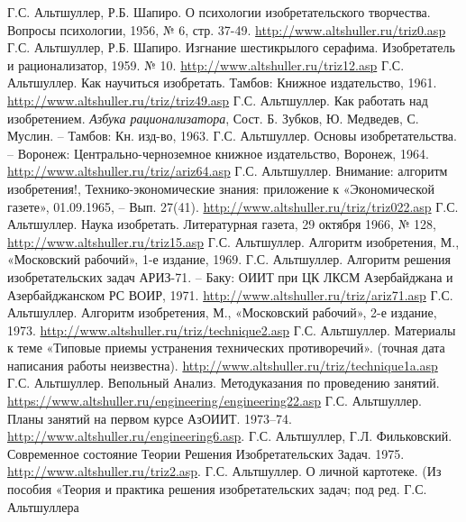 \begin{thebibliography}{xxx}
 Г.С. Альтшуллер, Р.Б. Шапиро. О психологии
  изобретательского творчества.  Вопросы психологии, 1956, № 6, стр. 37-49.
  \url{http://www.altshuller.ru/triz0.asp}
 Г.С. Альтшуллер, Р.Б. Шапиро. Изгнание шестикрылого
  серафима. Изобретатель и рационализатор, 1959. № 10.
  \url{http://www.altshuller.ru/triz12.asp}
 Г.С. Альтшуллер. Как научиться изобретать. Тамбов:
  Книжное издательство, 1961.  \url{http://www.altshuller.ru/triz/triz49.asp} 
 Г.С. Альтшуллер. Как работать над изобретением.
  \emph{Азбука рационализатора}, Сост. Б. Зубков, Ю. Медведев, С. Муслин. --
  Тамбов: Кн. изд-во, 1963.
 Г.С. Альтшуллер. Основы изобретательства. – Воронеж:
  Центрально-черноземное книжное издательство, Воронеж, 1964.
  \url{http://www.altshuller.ru/triz/ariz64.asp}
 Г.С. Альтшуллер. Внимание: алгоритм изобретения!,
  Технико-экономические знания: приложение к «Экономической газете»,
  01.09.1965, -- Вып. 27(41).  \url{http://www.altshuller.ru/triz/triz022.asp} 
 Г.С. Альтшуллер. Наука изобретать. Литературная
  газета, 29 октября 1966, № 128, \url{http://www.altshuller.ru/triz15.asp}
 Г.С. Альтшуллер.  Алгоритм изобретения, М.,
  «Московский рабочий», 1-е издание, 1969.
 Г.С. Альтшуллер.  Алгоритм решения изобретательских
  задач АРИЗ-71. – Баку: ОИИТ при ЦК ЛКСМ Азербайджана и Азербайджанском РС
  ВОИР, 1971. \url{http://www.altshuller.ru/triz/ariz71.asp}
 Г.С. Альтшуллер.  Алгоритм изобретения, М.,
  «Московский рабочий», 2-е издание, 1973.
  \url{http://www.altshuller.ru/triz/technique2.asp} 
 Г.С. Альтшуллер.  Материалы к теме «Типовые приемы
  устранения технических противоречий». (точная дата написания работы
  неизвестна).  \url{http://www.altshuller.ru/triz/technique1a.asp}
 Г.С. Альтшуллер. Вепольный Анализ. Методуказания по
  проведению занятий.
  \url{https://www.altshuller.ru/engineering/engineering22.asp}
 Г.С. Альтшуллер. Планы занятий на первом курсе
  АзОИИТ.  1973--74. \url{http://www.altshuller.ru/engineering6.asp}.
 Г.С. Альтшуллер, Г.Л. Фильковский. Современное
  состояние Теории Решения Изобретательских Задач. 1975.
  \url{http://www.altshuller.ru/triz2.asp}.
 Г.С. Альтшуллер. О личной картотеке. (Из пособия
  «Теория и практика решения изобретательских задач; под ред. Г.С. Альтшуллера

\end{thebibliography}
